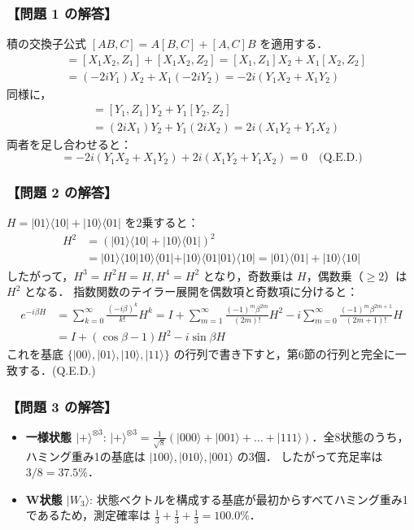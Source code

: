 \documentclass[11pt,a4paper,oneside,openany]{ltjsbook}
\theoremstyle{definition}
\theoremstyle{plain}
\theoremstyle{remark}
\newcommand{\ket}[1]{|#1\rangle}
\newcommand{\bra}[1]{\langle#1|}
\newcommand{\braket}[2]{\langle#1|#2\rangle}
\begin{document}
\subsubsection*{【問題 1 の解答】}
積の交換子公式 $[AB, C] = A[B, C] + [A, C]B$ を適用する．
\begin{align*}
    [X_1 X_2, Z_1 + Z_2] &= [X_1 X_2, Z_1] + [X_1 X_2, Z_2] = [X_1, Z_1] X_2 + X_1 [X_2, Z_2] \\
    &= (-2i Y_1) X_2 + X_1 (-2i Y_2) = -2i (Y_1 X_2 + X_1 Y_2)
\end{align*}
同様に，
\begin{align*}
    [Y_1 Y_2, Z_1 + Z_2] &= [Y_1, Z_1] Y_2 + Y_1 [Y_2, Z_2] \\
    &= (2i X_1) Y_2 + Y_1 (2i X_2) = 2i (X_1 Y_2 + Y_1 X_2)
\end{align*}
両者を足し合わせると：
\begin{equation}
    [X_1 X_2 + Y_1 Y_2, Z_1 + Z_2] = -2i(Y_1 X_2 + X_1 Y_2) + 2i(X_1 Y_2 + Y_1 X_2) = 0 \quad \text{(Q.E.D.)}
\end{equation}

\subsubsection*{【問題 2 の解答】}
$H = \ket{01}\bra{10} + \ket{10}\bra{01}$ を2乗すると：
\begin{align*}
    H^2 &= (\ket{01}\bra{10} + \ket{10}\bra{01})^2 \\
    &= \ket{01}\braket{10}{10}\bra{01} + \ket{10}\braket{01}{01}\bra{10} = \ket{01}\bra{01} + \ket{10}\bra{10}
\end{align*}
したがって，$H^3 = H^2 H = H, H^4 = H^2$ となり，奇数乗は $H$，偶数乗（$\ge 2$）は $H^2$ となる．
指数関数のテイラー展開を偶数項と奇数項に分けると：
\begin{align*}
    e^{-i \beta H} &= \sum_{k=0}^\infty \frac{(-i \beta)^k}{k!} H^k = I + \sum_{m=1}^\infty \frac{(-1)^m \beta^{2m}}{(2m)!} H^2 - i \sum_{m=0}^\infty \frac{(-1)^m \beta^{2m+1}}{(2m+1)!} H \\
    &= I + (\cos\beta - 1) H^2 - i \sin\beta H
\end{align*}
これを基底 $\{\ket{00}, \ket{01}, \ket{10}, \ket{11}\}$ の行列で書き下すと，第6節の行列と完全に一致する．\quad (Q.E.D.)

\subsubsection*{【問題 3 の解答】}
\begin{itemize}
    \item \textbf{一様状態 $\ket{+}^{\otimes 3}$}:
          $\ket{+}^{\otimes 3} = \frac{1}{\sqrt{8}} (\ket{000} + \ket{001} + \dots + \ket{111})$．全8状態のうち，ハミング重み1の基底は $\ket{100}, \ket{010}, \ket{001}$ の3個．
          したがって充足率は $3/8 = \mathbf{37.5\%}$．
    \item \textbf{W状態 $\ket{W_3}$}:
          状態ベクトルを構成する基底が最初からすべてハミング重み1であるため，測定確率は $\frac{1}{3} + \frac{1}{3} + \frac{1}{3} = \mathbf{100.0\%}$．
\end{itemize}
\end{document}
